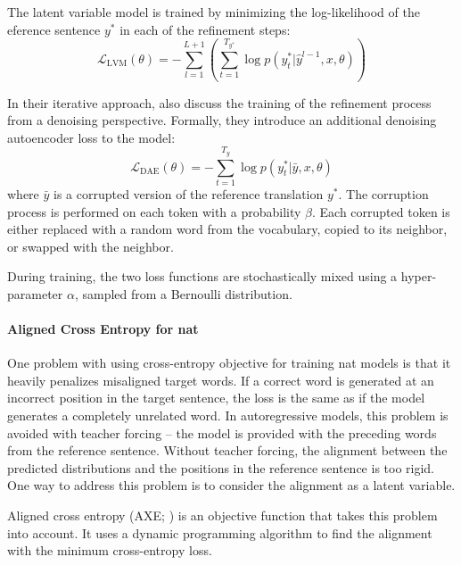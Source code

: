 The latent variable model is trained by minimizing the log-likelihood of the
eference sentence $y^*$ in each of the refinement steps:
\begin{equation}
  \mathcal{L}_{\text{LVM}}(\theta) = - \sum_{l=1}^{L+1} \left(
    \sum_{t=1}^{T_{y^*}} \log p(y_t^* | \hat{y}^{l-1}, x, \theta)
  \right) \label{eq:refinement-lvm-loss}
\end{equation}

In their iterative approach, \citet{lee-etal-2018-deterministic} also discuss
the training of the refinement process from a denoising perspective. Formally,
they introduce an additional denoising autoencoder loss to the model:
%
\begin{equation}
  \mathcal{L}_{\text{DAE}}(\theta) = - \sum_{t=1}^{T_y} \log p(y_t^* | \bar{y}, x, \theta)
\end{equation}
where $\bar{y}$ is a corrupted version of the reference translation $y^*$. The
corruption process is performed on each token with a probability $\beta$. Each
corrupted token is either replaced with a random word from the vocabulary,
copied to its neighbor, or swapped with the neighbor.

During training, the two loss functions are stochastically mixed using a
hyper-parameter $\alpha$, sampled from a Bernoulli distribution.


\paragraph{Aligned Cross Entropy for \ac{nat}} One problem with using
cross-entropy objective for training \ac{nat} models is that it heavily
penalizes misaligned target words. If a correct word is generated at an
incorrect position in the target sentence, the loss is the same as if the model
generates a completely unrelated word. In autoregressive models, this problem
is avoided with teacher forcing -- the model is provided with the preceding
words from the reference sentence. Without teacher forcing, the alignment
between the predicted distributions and the positions in the reference sentence
is too rigid. One way to address this problem is to consider the alignment as a
latent variable. 

Aligned cross entropy (AXE; \citealp{ghazvininejad2020aligned}) is an objective
function that takes this problem into account. It uses a dynamic programming
algorithm to find the alignment with the minimum cross-entropy loss. 

